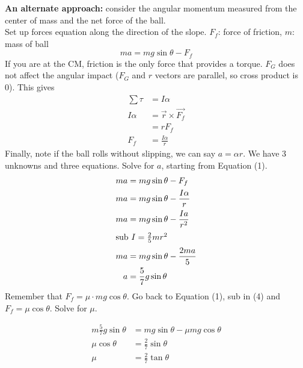 \documentclass[12pt]{article}
\begin{document}
\textbf{An alternate approach:} consider the angular momentum measured from the center of mass and the net force of the ball. \\

Set up forces equation along the direction of the slope. $F_f$: force of friction, $m$: mass of ball
\begin{equation}
    ma = mg\sin\theta - F_{f}
\end{equation}
If you are at the CM, friction is the only force that provides a torque. $F_G$ does not affect the angular impact ($F_G$ and $r$ vectors are parallel, so cross product is 0). This gives 
\begin{align}
    \sum \tau &= I \alpha \nonumber \\
    I\alpha &= \vec{r} \times \vec{F_f}  \\
            &= rF_f \nonumber \\
    F_f     &= \frac{I\alpha}{r}
\end{align}
Finally, note if the ball rolls without slipping, we can say $a = \alpha r$. We have 3 unknowns and three equations. Solve for $a$, starting from Equation (1).
\begin{align}
    ma &= mg\sin\theta - F_{f} \nonumber \\
    ma &= mg\sin\theta - \frac{I\alpha}{r}\nonumber \\
    ma &= mg\sin\theta - \frac{I a}{r^2} \nonumber \\
    \intertext{sub $I = \frac{2}{5}mr^2$}
    ma &= mg\sin\theta - \frac{2 ma}{5} \nonumber \\
    a &= \frac{5}{7}g\sin\theta
\end{align}
Remember that $F_f = \mu\cdot mg\cos\theta$. Go back to Equation (1), sub in (4) and $F_f = \mu \cos\theta$. Solve for $\mu$.

\begin{align*}
    m \frac{5}{7} g \sin\theta &= mg\sin\theta - \mu mg\cos\theta \\
    \mu \cos\theta &= \frac{2}{7}\sin\theta \\
    \mu &= \frac{2}{7}\tan\theta
\end{align*}
\end{document}
